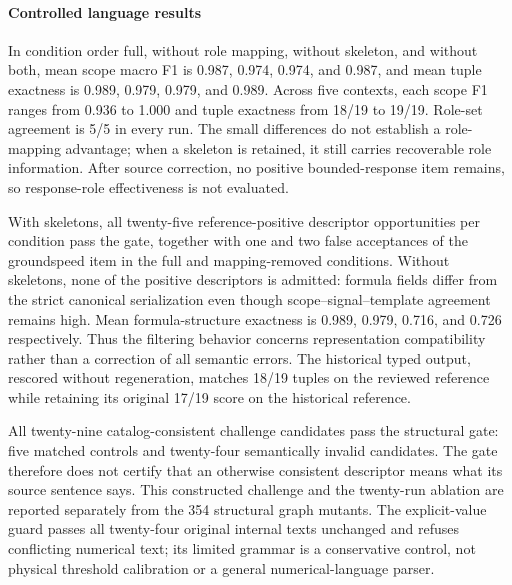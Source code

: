 \paragraph{Controlled language results}
In condition order full, without role mapping, without skeleton, and without both, mean scope macro F1 is 0.987, 0.974, 0.974, and 0.987, and mean tuple exactness is 0.989, 0.979, 0.979, and 0.989. Across five contexts, each scope F1 ranges from 0.936 to 1.000 and tuple exactness from 18/19 to 19/19. Role-set agreement is 5/5 in every run. The small differences do not establish a role-mapping advantage; when a skeleton is retained, it still carries recoverable role information. After source correction, no positive bounded-response item remains, so response-role effectiveness is not evaluated.

With skeletons, all twenty-five reference-positive descriptor opportunities per condition pass the gate, together with one and two false acceptances of the groundspeed item in the full and mapping-removed conditions. Without skeletons, none of the positive descriptors is admitted: formula fields differ from the strict canonical serialization even though scope--signal--template agreement remains high. Mean formula-structure exactness is 0.989, 0.979, 0.716, and 0.726 respectively. Thus the filtering behavior concerns representation compatibility rather than a correction of all semantic errors. The historical typed output, rescored without regeneration, matches 18/19 tuples on the reviewed reference while retaining its original 17/19 score on the historical reference.

All twenty-nine catalog-consistent challenge candidates pass the structural gate: five matched controls and twenty-four semantically invalid candidates. The gate therefore does not certify that an otherwise consistent descriptor means what its source sentence says. This constructed challenge and the twenty-run ablation are reported separately from the 354 structural graph mutants. The explicit-value guard passes all twenty-four original internal texts unchanged and refuses conflicting numerical text; its limited grammar is a conservative control, not physical threshold calibration or a general numerical-language parser.

